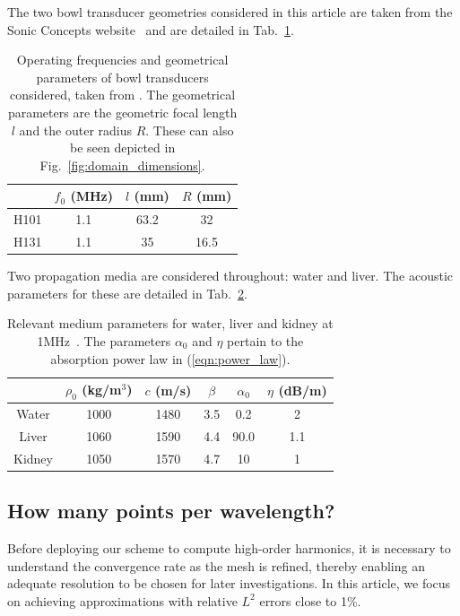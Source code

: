 \documentclass[preprint]{JASA}
\newcommand{\red}[1]{{\color{red} #1}}
\begin{document}
The two bowl transducer geometries considered in this article are taken from 
the Sonic Concepts website~\cite{sonic} and are detailed in Tab.~\ref{tab:transducers}.
\begin{table}[h!]
    \centering
    \begin{tabular}{c  c  c  c}
        \hline\hline
           & $f_0$ (MHz) & $l$ (mm) & $R$ (mm)\\ %
        \hline
        H101 & 1.1 & 63.2 & \red{32} \\ %
        H131 & 1.1 & 35 & \red{16.5} \\ %
        \hline\hline
    \end{tabular}
    \caption{Operating frequencies and geometrical parameters of bowl transducers
    considered, taken from \cite{sonic}. The geometrical parameters are the 
    geometric focal length $l$ and the outer radius $R$.
    These can also be seen depicted in Fig.~\ref{fig:domain_dimensions}.}
    \label{tab:transducers}
\end{table}
Two propagation media are considered throughout: water and liver. The 
acoustic parameters for these are detailed in Tab.~\ref{tab:media}.
\begin{table}[h!]
    \centering
    \begin{tabular}{c  c  c  c  c  c}
        \hline\hline
           & $\rho_0$ (kg/m$^3$) & $c$ (m/s) & $\beta$ & $\alpha_0$ & $\eta$ (dB/m) \\
        \hline
        Water & 1000 & 1480 & 3.5 & 0.2 & 2 \\
        Liver & 1060 & 1590 & 4.4 & 90.0 & 1.1 \\
        Kidney & 1050 & 1570 & 4.7 & 10 & 1 \\
        \hline\hline
    \end{tabular}
    \caption{Relevant medium parameters for water, liver and kidney at 1MHz~\cite{duck2013physical,azhari2010basics}. The parameters 
    $\alpha_0$ and $\eta$ pertain to the absorption power law in (\ref{eqn:power_law}).}
    \label{tab:media}
\end{table}

\subsection{How many points per wavelength?}
Before deploying our scheme to compute high-order harmonics, it is necessary to
understand the convergence rate as the mesh is refined, thereby enabling
an adequate resolution to be chosen for later investigations. In this article, we 
focus on achieving approximations with relative $L^2$ errors close to 1\%. 
\end{document}
